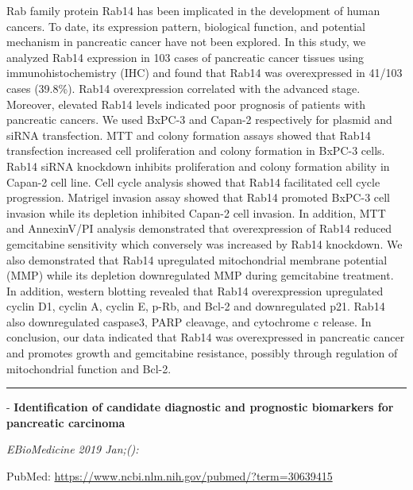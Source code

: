 \documentclass[]{article}
\begin{document}
Rab family protein Rab14 has been implicated in the development of human
cancers. To date, its expression pattern, biological function, and
potential mechanism in pancreatic cancer have not been explored. In this
study, we analyzed Rab14 expression in 103 cases of pancreatic cancer
tissues using immunohistochemistry (IHC) and found that Rab14 was
overexpressed in 41/103 cases (39.8\%). Rab14 overexpression correlated
with the advanced stage. Moreover, elevated Rab14 levels indicated poor
prognosis of patients with pancreatic cancers. We used BxPC-3 and
Capan-2 respectively for plasmid and siRNA transfection. MTT and colony
formation assays showed that Rab14 transfection increased cell
proliferation and colony formation in BxPC-3 cells. Rab14 siRNA
knockdown inhibits proliferation and colony formation ability in Capan-2
cell line. Cell cycle analysis showed that Rab14 facilitated cell cycle
progression. Matrigel invasion assay showed that Rab14 promoted BxPC-3
cell invasion while its depletion inhibited Capan-2 cell invasion. In
addition, MTT and AnnexinV/PI analysis demonstrated that overexpression
of Rab14 reduced gemcitabine sensitivity which conversely was increased
by Rab14 knockdown. We also demonstrated that Rab14 upregulated
mitochondrial membrane potential (MMP) while its depletion downregulated
MMP during gemcitabine treatment. In addition, western blotting revealed
that Rab14 overexpression upregulated cyclin D1, cyclin A, cyclin E,
p-Rb, and Bcl-2 and downregulated p21. Rab14 also downregulated
caspase3, PARP cleavage, and cytochrome c release. In conclusion, our
data indicated that Rab14 was overexpressed in pancreatic cancer and
promotes growth and gemcitabine resistance, possibly through regulation
of mitochondrial function and Bcl-2.

{}

{}

\begin{center}\rule{0.5\linewidth}{\linethickness}\end{center}

 - \textbf{Identification of candidate diagnostic and prognostic
biomarkers for pancreatic carcinoma}

\emph{EBioMedicine 2019 Jan;():}

PubMed: \url{https://www.ncbi.nlm.nih.gov/pubmed/?term=30639415}
\end{document}
